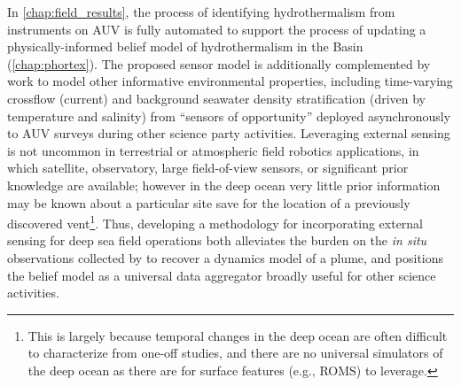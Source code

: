In \cref{chap:field_results}, the process of identifying hydrothermalism from instruments on AUV \Sentry is fully automated to support the process of updating a physically-informed belief model of hydrothermalism in the Basin (\cref{chap:phortex}).
The proposed sensor model is additionally complemented by work to model other informative environmental properties, including time-varying crossflow (current) and background seawater density stratification (driven by temperature and salinity) from ``sensors of opportunity'' deployed asynchronously to AUV \Sentry surveys during other science party activities.
Leveraging external sensing is not uncommon in terrestrial or atmospheric field robotics applications, in which satellite, observatory, large field-of-view sensors, or significant prior knowledge are available\autocite{everett2019planning,heaney2007nonlinear,desaraju2015vision}; however in the deep ocean very little prior information may be known about a particular site save for the location of a previously discovered vent\footnote{This is largely because temporal changes in the deep ocean are often difficult to characterize from one-off studies, and there are no universal simulators of the deep ocean as there are for surface features (e.g., ROMS) to leverage.}.
Thus, developing a methodology for incorporating external sensing for deep sea field operations both alleviates the burden on the \emph{in situ} observations collected by \Sentry to recover a dynamics model of a plume, and positions the belief model as a universal data aggregator broadly useful for other science activities.


